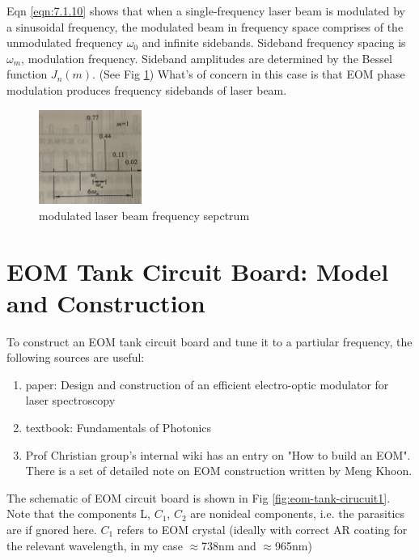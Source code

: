 \documentclass[12pt]{report}
\begin{document}
Eqn \ref{eqn:7.1.10} shows that when a single-frequency laser beam is modulated by a sinusoidal frequency, the modulated beam in frequency space comprises of the unmodulated frequency $\omega_0$ and infinite sidebands. Sideband frequency spacing is $\omega_m$, modulation frequency. 
Sideband amplitudes are determined by the Bessel function $J_n(m)$. (See Fig \ref{fig:EOMsidebandTheory}) What's of concern in this case is that EOM phase modulation produces frequency sidebands of laser beam. 

\begin{figure}[H]
    \centering
    \includegraphics[width=0.3\textwidth]{EOMsidebandTheory.png}
    \caption{modulated laser beam frequency sepctrum}
    \label{fig:EOMsidebandTheory}
\end{figure}

\section{EOM Tank Circuit Board: Model and Construction}
To construct an EOM tank circuit board and tune it to a partiular frequency, the following sources are useful: 
\begin{enumerate}
    \item paper: Design and construction of an efficient electro-optic modulator for laser spectroscopy\cite{20MHzEOM}
    \item textbook: Fundamentals of Photonics\cite{fundamentalsOfPhotonics}
    \item Prof Christian group's internal wiki has an entry on "How to build an EOM". There is a set of detailed note on EOM construction written by Meng Khoon. 
\end{enumerate}
The schematic of EOM circuit board is shown in Fig \ref{fig:eom-tank-cirucuit1}. Note that the components L, $C_1$, $C_2$ are nonideal components, i.e. the parasitics are if gnored here.
$C_1$ refers to EOM crystal (ideally with correct AR coating for the relevant wavelength, in my case $\approx$738nm and $\approx$965nm)
\end{document}
